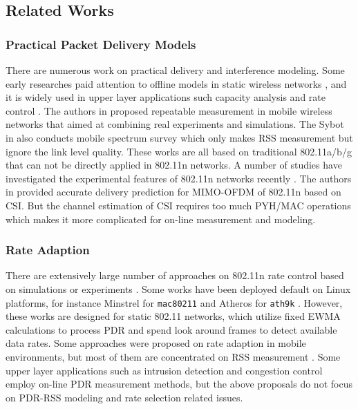 \documentclass[draftclsnofoot,conference,onecolumn,11pt]{IEEEtran}
\begin{document}
\subsection{Related Works}
\subsubsection{Practical Packet Delivery Models}
There are numerous work on practical delivery and interference modeling. Some early researches paid attention to offline models in static wireless networks \cite{kolar2011mesh} \cite{reis2006model}, and it is widely used in upper layer applications such capacity analysis \cite{kashyap2007capacity} and rate control \cite{chen2011ram} \cite{judd2008efficient}. The authors in \cite{10.1109/TMC.2009.87} proposed repeatable measurement in mobile wireless networks that aimed at combining real experiments and simulations. The Sybot in \cite{kim2010sybot} also conducts mobile spectrum survey which only makes RSS measurement but ignore the link level quality. These works are all based on traditional 802.11a/b/g that can not be directly applied in 802.11n networks. A number of studies have investigated the experimental features of 802.11n networks recently \cite{Halperin2010predictable} \cite{k.rayanchu:fluid:}. The authors in \cite{Halperin2010predictable} provided accurate delivery prediction for MIMO-OFDM of 802.11n based on CSI. But the channel estimation of CSI \cite{CSI-SF} requires too much PYH/MAC operations which makes it more complicated for on-line measurement and modeling.

\subsubsection{Rate Adaption}
There are extensively large number of approaches on 802.11n rate control based on simulations or experiments \cite{kim2009experimental} \cite{Pefkianakis:2010} \cite{zhang2008practical}. Some works have been deployed default on Linux platforms, for instance Minstrel \cite{minstrel} for \texttt{mac80211} and Atheros for \texttt{ath9k} \cite{wong2008wireless}. However, these works are designed for static 802.11 networks, which utilize fixed EWMA calculations to process PDR and spend look around frames to detect available data rates. Some approaches were proposed on rate adaption in mobile environments, but most of them are concentrated on RSS measurement \cite{chen2011ram} \cite{judd2008efficient}. Some upper layer applications such as intrusion detection \cite{5620919} and congestion control \cite{floyd2000equation} employ on-line PDR measurement methods, but the above proposals do not focus on PDR-RSS modeling and rate selection related issues.
\end{document}
